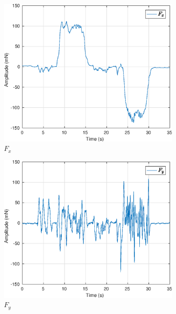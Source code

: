 \begin{figure}[H]
\centering
\begin{subfigure}{.5\textwidth}
  \centering
  \includegraphics[width=\linewidth]{./img/float2/Fx.eps}
  \caption{$F_x$}
  \label{fig:sub1}
\end{subfigure}%
\begin{subfigure}{.5\textwidth}
  \centering
  \includegraphics[width=\linewidth]{./img/float2/Fy.eps}
  \caption{$F_y$}
  \label{fig:sub2}	
\end{subfigure}
\begin{subfigure}{.5\textwidth}

\end{subfigure}
\end{figure}
